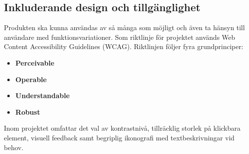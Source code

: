 \subsection{Inkluderande design och tillgänglighet}
Produkten ska kunna användas av så många som möjligt och även ta hänsyn till användare med funktionsvariationer. Som riktlinje för projektet används Web Content Accessibility Guidelines (WCAG). Riktlinjen följer fyra grundprinciper:
\begin{itemize}
    \item \textbf{Perceivable}
    \item \textbf{Operable}
    \item \textbf{Understandable}
    \item \textbf{Robust}
\end{itemize}

Inom projektet omfattar det val av kontrastnivå, tillräcklig storlek på klickbara element, visuell feedback samt begriplig ikonografi med textbeskrivningar vid behov. 
